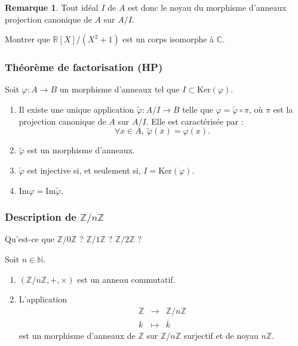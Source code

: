 \documentclass[french]{article}
\newcommand{\N}{\mathbb{N}}
\newcommand{\Z}{\mathbb{Z}}
\newcommand{\R}{\mathbb{R}}
\newcommand{\C}{\mathbb{C}}
\renewcommand{\ker}{\text{Ker}}
\theoremstyle{plain}
\theoremstyle{definition}
\newtheorem*{rmq}{Remarque}
\theoremstyle{remark}
\begin{document}
\begin{rmq}
	Tout idéal $I$ de $A$ est donc le noyau du morphisme d'anneaux projection canonique de $A$ sur $A/I$.
\end{rmq}

\begin{exo}
	Montrer que $\R[X]/(X^2+1)$ est un corps isomorphe à $\C$.
\end{exo}

\subsubsection*{Théorème de factorisation (HP)}

\begin{thm}%
	Soit $\varphi:A\to B$ un morphisme d'anneaux tel que $I\subset\ker(\varphi)$.
	\begin{enumerate}
		\item Il existe une unique application $\tilde{\varphi}:A/I\to B$ telle que $\varphi=\tilde{\varphi}\circ\pi$, où $\pi$ est la projection canonique de $A$ sur $A/I$. Elle est caractérisée par :
		$$\forall x\in A,\ \tilde{\varphi}(\overline{x})=\varphi(x).$$
		\item $\tilde{\varphi}$ est un morphisme d'anneaux.
		\item $\tilde{\varphi}$ est injective si, et seulement si, $I=\ker(\varphi)$.
		\item $\text{Im}\varphi=\text{Im}\tilde{\varphi}$.
	\end{enumerate}
\end{thm}

\subsubsection*{Description de $\Z/n\Z$}

\begin{exo}
	Qu'est-ce que $\Z/0\Z$ ? $\Z/1\Z$ ? $\Z/2\Z$ ?
\end{exo}

\begin{cor}%
	Soit $n\in\N$.
	\begin{enumerate}
		\item $(\Z/n\Z,+,\times)$ est un anneau commutatif.
		\item L'application 
		$$\begin{array}{rcl}
			\Z&\longrightarrow&\Z/n\Z\\
			k&\longmapsto&\overline{k}
		\end{array}$$ est un morphisme d'anneaux de $\Z$ sur $\Z/n\Z$ surjectif et de noyau $n\Z$.
	\end{enumerate}
\end{cor}
\end{document}

